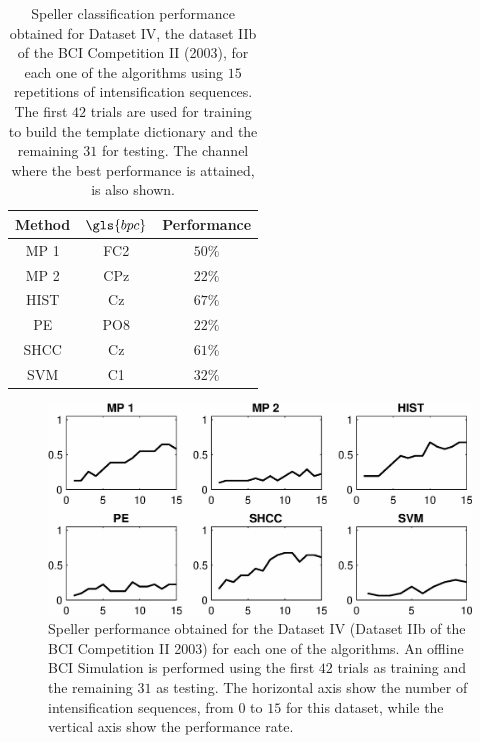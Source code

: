 \begin{table}[h!]
\caption[Dataset IV - Speller Performance]{Speller classification performance obtained for Dataset IV, the dataset IIb of the BCI Competition II (2003), for each one of the algorithms using $15$ repetitions of intensification sequences. The first $42$ trials are used for training to build the template dictionary and the remaining $31$ for testing. The channel where the best performance is attained, is also shown. }
\centering
\begin{tabular}{ccc}
\toprule
\textbf{Method}	& \textbf{$\gls{bpc}$} &  \textbf{Performance} \\
\midrule
MP 1 & FC2  & $50\%$ \\
MP 2 & CPz & $22\%$ \\
HIST  & Cz & $67\%$ \\
PE     & PO8 & $22\%$ \\
SHCC & Cz & $61\%$ \\
SVM     & C1  & $32\%$ \\
\bottomrule
\end{tabular}
\label{tab:bcicompetitionresults}
\end{table}

\begin{figure}[h!]
\centering
\includegraphics[width=15cm]{images/PerformanceBCICompetition.eps}
\caption[Dataset IIb BCI Competition II (2003) Speller Performance]{Speller performance obtained for the Dataset IV (Dataset IIb of the BCI Competition II 2003) for each one of the algorithms.  An offline BCI Simulation is performed using the first $42$ trials as training and the remaining $31$ as testing.  The horizontal axis show the number of intensification sequences, from $0$ to $15$ for this dataset, while the vertical axis show the performance rate.}
\label{fig:performancebcicompetition}
\end{figure}

